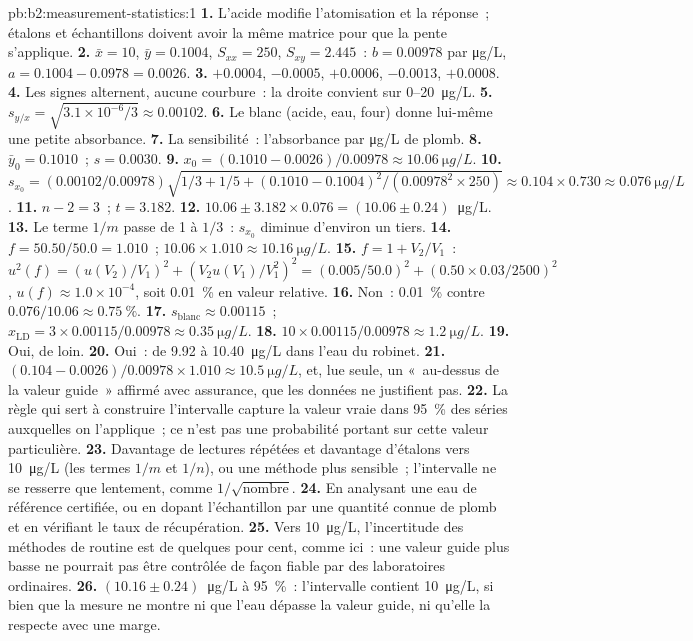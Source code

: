 \begin{solution}{pb:b2:measurement-statistics:1}
\textbf{1.} L'acide modifie l'atomisation et la réponse~; étalons et échantillons doivent avoir la même
matrice pour que la pente s'applique.
\textbf{2.} $\bar x = 10$, $\bar y = 0.1004$, $S_{xx} = 250$, $S_{xy} = 2.445$~: $b = 0.00978$ par
\unit{\micro g/L}, $a = 0.1004 - 0.0978 = 0.0026$.
\textbf{3.} $+0.0004$, $-0.0005$, $+0.0006$, $-0.0013$, $+0.0008$.
\textbf{4.} Les signes alternent, aucune courbure~: la droite convient sur 0--\qty{20}{\micro g/L}.
\textbf{5.} $s_{y/x} = \sqrt{3.1 \times 10^{-6}/3} \approx 0.00102$.
\textbf{6.} Le blanc (acide, eau, four) donne lui-même une petite absorbance.
\textbf{7.} La sensibilité~: l'absorbance par \unit{\micro g/L} de plomb.
\textbf{8.} $\bar y_0 = 0.1010$~; $s = 0.0030$.
\textbf{9.} $x_0 = (0.1010 - 0.0026)/0.00978 \approx \qty{10.06}{\micro g/L}$.
\textbf{10.} $s_{x_0} = (0.00102/0.00978)\sqrt{1/3 + 1/5 + (0.1010 - 0.1004)^2/(0.00978^2 \times 250)}
\approx 0.104 \times 0.730 \approx \qty{0.076}{\micro g/L}$.
\textbf{11.} $n - 2 = 3$~; $t = 3.182$.
\textbf{12.} $10.06 \pm 3.182 \times 0.076 = (10.06 \pm 0.24)$~\unit{\micro g/L}.
\textbf{13.} Le terme $1/m$ passe de 1 à $1/3$~: $s_{x_0}$ diminue d'environ un tiers.
\textbf{14.} $f = 50.50/50.0 = 1.010$~; $10.06 \times 1.010 \approx \qty{10.16}{\micro g/L}$.
\textbf{15.} $f = 1 + V_2/V_1$~: $u^2(f) = (u(V_2)/V_1)^2 + (V_2u(V_1)/V_1^2)^2 = (0.005/50.0)^2 +
(0.50 \times 0.03/2500)^2$, $u(f) \approx 1.0 \times 10^{-4}$, soit 0.01~\% en valeur relative.
\textbf{16.} Non~: 0.01~\% contre $0.076/10.06 \approx 0.75~\%$.
\textbf{17.} $s_{\mathrm{blanc}} \approx 0.00115$~; $x_{\mathrm{LD}} = 3 \times 0.00115/0.00978 \approx
\qty{0.35}{\micro g/L}$.
\textbf{18.} $10 \times 0.00115/0.00978 \approx \qty{1.2}{\micro g/L}$.
\textbf{19.} Oui, de loin.
\textbf{20.} Oui~: de 9.92 à \qty{10.40}{\micro g/L} dans l'eau du robinet.
\textbf{21.} $(0.104 - 0.0026)/0.00978 \times 1.010 \approx \qty{10.5}{\micro g/L}$, et, lue seule, un
«~au-dessus de la valeur guide~» affirmé avec assurance, que les données ne justifient pas.
\textbf{22.} La règle qui sert à construire l'intervalle capture la valeur vraie dans 95~\% des séries
auxquelles on l'applique~; ce n'est pas une probabilité portant sur cette valeur particulière.
\textbf{23.} Davantage de lectures répétées et davantage d'étalons vers \qty{10}{\micro g/L} (les termes
$1/m$ et
$1/n$), ou une méthode plus sensible~; l'intervalle ne se resserre que lentement, comme $1/\sqrt{\text{nombre}}$.
\textbf{24.} En analysant une eau de référence certifiée, ou en dopant l'échantillon par une quantité
connue de plomb et en vérifiant le taux de récupération.
\textbf{25.} Vers \qty{10}{\micro g/L}, l'incertitude des méthodes de routine est de quelques pour cent,
comme ici~: une valeur guide plus basse ne pourrait pas être contrôlée de façon fiable par des
laboratoires ordinaires.
\textbf{26.} $\boldsymbol{(10.16 \pm 0.24)}$~\unit{\micro g/L} à 95~\%~: l'intervalle contient
\qty{10}{\micro g/L}, si bien que la mesure ne montre ni que l'eau dépasse la valeur guide, ni qu'elle la
respecte avec une marge.
\end{solution}
